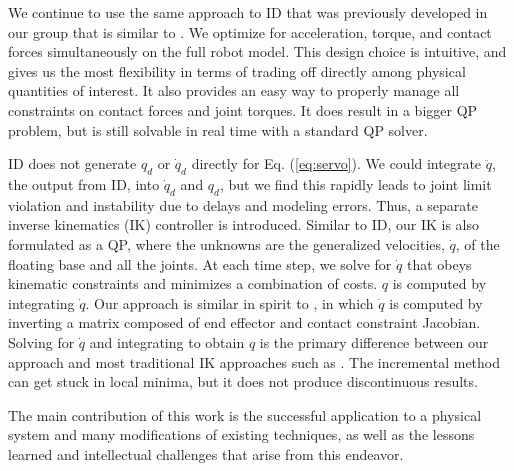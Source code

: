 \documentclass{ws-ijhr}
\newcommand{\eref}[1] {Eq. (\ref{#1})}
\begin{document}
We continue to use the same approach to ID that was previously 
developed in our group \cite{stephens_thesis,whitman_thesis,sfeng_online} 
that is similar to \cite{deLasa_hir,bouyarmane_vrc}. 
We optimize for acceleration, torque, and contact forces simultaneously on 
the full robot model. 
This design choice is intuitive, and gives us the most
flexibility in terms of trading off directly among physical quantities of 
interest. 
It also provides an easy way to properly manage all constraints on 
contact forces and joint torques. It does result in a bigger QP problem, 
but is still solvable in real time with a standard QP solver. 

ID does not generate $q_d$ or $\dot{q}_d$ directly for \eref{eq:servo}.
We could integrate $\ddot{q}$, the output from ID, into $\dot{q}_d$ and $q_d$, 
but we find this rapidly leads to joint limit violation and instability 
due to delays and modeling errors. Thus, a separate inverse kinematics (IK) 
controller is introduced. 
Similar to ID, our IK is also formulated as a QP, where the unknowns are the 
generalized velocities, $\dot{q}$, of the floating base and all the joints. 
At each time step, we solve for $\dot{q}$ that obeys kinematic constraints 
and minimizes a combination of costs. $q$ is computed by integrating $\dot{q}$. 
Our approach is similar in spirit to \cite{mistry_ik}, in which $\dot{q}$ is 
computed by inverting a matrix composed of end 
effector and contact constraint Jacobian. 
Solving for $\dot{q}$ and integrating to obtain $q$ is the primary difference
between our approach and most traditional IK approaches such as 
\cite{kajita03,asimo}. 
The incremental method can get stuck in local minima, but it does not produce 
discontinuous results. 

The main contribution of this work is the successful application to a physical 
system and many modifications of existing techniques, as well as 
the lessons learned and intellectual challenges that arise from this endeavor. 

\end{document}
